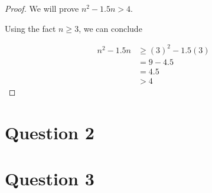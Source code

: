 \documentclass[12pt]{article}
\begin{document}
\begin{enumerate}[a.]
\begin{proof}
        \bigskip

        We will prove $n^2 - 1.5n > 4$.

        \bigskip

        Using the fact $n \geq 3$, we can conclude

        \setcounter{equation}{0}
        \begin{align}
            n^2 - 1.5n &\geq (3)^2 - 1.5(3)\\
            &= 9 - 4.5\\
            &= 4.5\\
            &> 4
        \end{align}
    \end{proof}

\end{enumerate}

\section*{Question 2}

\section*{Question 3}
\end{document}
